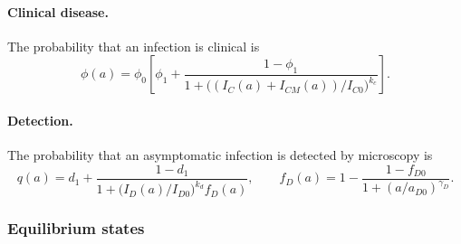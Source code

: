 \paragraph{Clinical disease.} The probability that an infection is clinical is
\begin{equation*}
\phi(a) = \phi_0\left[\phi_1 + \frac{1 - \phi_1}{1 + \big((I_C(a) + I_{CM}(a))/I_{C0}\big)^{k_c}}\right].
\end{equation*}

\paragraph{Detection.} The probability that an asymptomatic infection is detected by microscopy is
\begin{equation*}
q(a) = d_1 + \frac{1 - d_1}{1 + \big(I_D(a)/I_{D0}\big)^{k_d} f_D(a)},
\qquad
f_D(a) = 1 - \frac{1 - f_{D0}}{1 + (a/a_{D0})^{\gamma_D}}.
\end{equation*}

\subsubsection{Equilibrium states}

